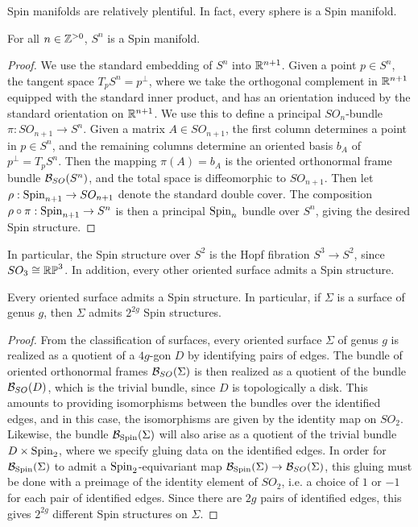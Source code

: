 %
Spin manifolds are relatively plentiful. In fact, every sphere is a Spin manifold.
%
\begin{thm}
For all $n \in \mathbb{Z}^{> 0}$, $S^n$ is a Spin manifold.
\end{thm}
%
\begin{proof}
We use the standard embedding of $S^n$ into $\mathbb{R}^{n+1}$. Given a point $p \in S^n$, the
tangent space $T_pS^n = p^\perp$, where we take the orthogonal complement in $\mathbb{R}^{n+1}$
equipped with the standard inner product, and has an orientation induced by the standard
orientation on $\mathbb{R}^{n+1}$. We use this to define a principal $SO_n$-bundle
$\pi : SO_{n+1} \to S^n$. Given a matrix $A \in SO_{n+1}$, the
first column determines a point in $p \in S^n$, and the remaining columns determine
an oriented basis $b_A$ of $p^\perp = T_pS^n$. Then the mapping $\pi(A) = b_A$
is the oriented orthonormal frame bundle $\mathcal{B}_{SO}(S^n)$, and the total space is
diffeomorphic to $SO_{n+1}$. Then let $\rho : \mathrm{Spin}_{n+1} \to SO_{n+1}$ denote the
standard double cover. The composition $\rho \circ \pi : \mathrm{Spin}_{n+1} \to S^n$ is then
a principal $\mathrm{Spin}_n$ bundle over $S^n$, giving the desired Spin structure.
\end{proof}
%
In particular, the Spin structure over $S^2$ is the Hopf fibration $S^3 \to S^2$,
since $SO_3 \cong \mathbb{RP}^3$. In addition, every other oriented surface admits a
Spin structure.
%
\begin{thm}
Every oriented surface admits a Spin structure. In particular, if $\Sigma$ is a
surface of genus $g$, then $\Sigma$ admits $2^{2g}$ Spin structures.
\end{thm}
%
\begin{proof}
From the classification of surfaces, every oriented surface $\Sigma$ of genus $g$
is realized as a quotient of a $4g$-gon $D$ by identifying pairs of edges. The
bundle of oriented orthonormal frames $\mathcal{B}_{SO}(\Sigma)$ is then realized as a
quotient of the bundle $\mathcal{B}_{SO}(D)$, which is the trivial bundle, since $D$ is
topologically a disk. This amounts to providing isomorphisms between the bundles
over the identified edges, and in this case, the isomorphisms are given by the
identity map on $SO_2$. Likewise, the bundle $\mathcal{B}_{\mathrm{Spin}}(\Sigma)$ will also arise
as a quotient of the trivial bundle $D \times \mathrm{Spin}_2$, where we specify gluing data
on the identified edges. In order for $\mathcal{B}_{\mathrm{Spin}}(\Sigma)$ to admit a
$\mathrm{Spin}_2$-equivariant map $\mathcal{B}_{\mathrm{Spin}}(\Sigma) \to \mathcal{B}_{SO}(\Sigma)$, this gluing
must be done with a preimage of the identity element of $SO_2$, i.e. a choice
of $1$ or $-1$ for each pair of identified edges. Since there are $2g$ pairs of
identified edges, this gives $2^{2g}$ different Spin structures on $\Sigma$.
\end{proof}
